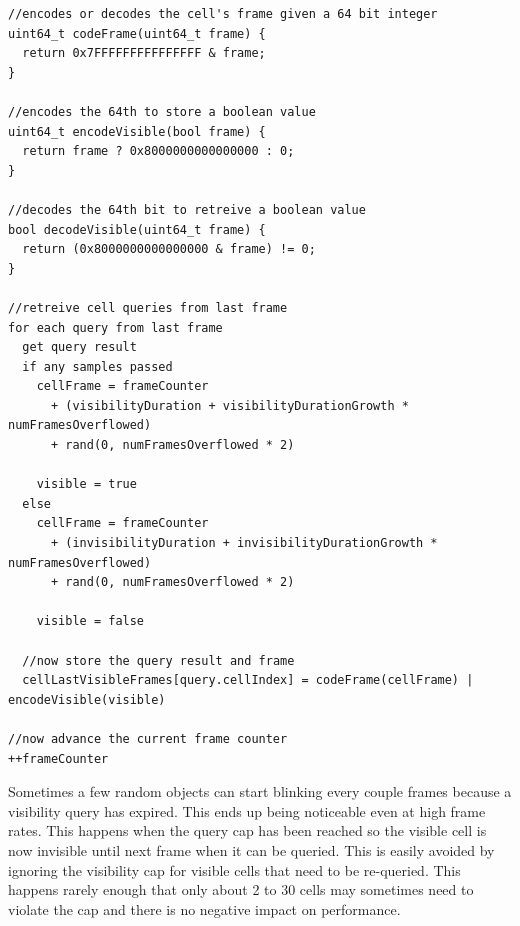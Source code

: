 \documentclass[12pt]{ucthesis}
\begin{document}
\begin{lstlisting}
//encodes or decodes the cell's frame given a 64 bit integer
uint64_t codeFrame(uint64_t frame) {
  return 0x7FFFFFFFFFFFFFFF & frame;
}

//encodes the 64th to store a boolean value
uint64_t encodeVisible(bool frame) {
  return frame ? 0x8000000000000000 : 0;
}

//decodes the 64th bit to retreive a boolean value
bool decodeVisible(uint64_t frame) {
  return (0x8000000000000000 & frame) != 0;
}

//retreive cell queries from last frame
for each query from last frame
  get query result
  if any samples passed
    cellFrame = frameCounter 
      + (visibilityDuration + visibilityDurationGrowth * numFramesOverflowed) 
      + rand(0, numFramesOverflowed * 2)

    visible = true
  else
    cellFrame = frameCounter 
      + (invisibilityDuration + invisibilityDurationGrowth * numFramesOverflowed) 
      + rand(0, numFramesOverflowed * 2)
    
    visible = false

  //now store the query result and frame
  cellLastVisibleFrames[query.cellIndex] = codeFrame(cellFrame) | encodeVisible(visible)

//now advance the current frame counter
++frameCounter
\end{lstlisting}

Sometimes a few random objects can start blinking every couple frames because a visibility query has expired.
This ends up being noticeable even at high frame rates.
This happens when the query cap has been reached so the visible cell is now invisible until next frame when it can be queried.
This is easily avoided by ignoring the visibility cap for visible cells that need to be re-queried.
This happens rarely enough that only about 2 to 30 cells may sometimes need to violate the cap and there is no negative impact on performance.
\end{document}
